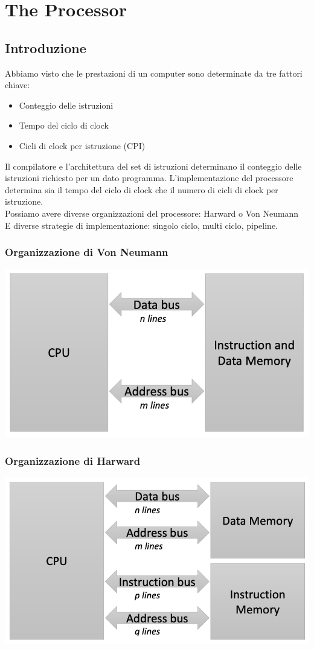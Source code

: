 \documentclass[12pt,a4paper]{article}
\begin{document}
\clearpage
\section{The Processor}
\subsection{Introduzione}
Abbiamo visto che le prestazioni di un computer sono determinate da tre fattori chiave:
\begin{itemize}
\item Conteggio delle istruzioni
\item Tempo del ciclo di clock
\item Cicli di clock per istruzione (CPI)
\end{itemize}
Il compilatore e l'architettura del set di istruzioni determinano il conteggio delle istruzioni richiesto per un dato programma. L'implementazione del processore determina sia il tempo del ciclo di clock che il numero di cicli di clock per istruzione.\\
Possiamo avere diverse organizzazioni del processore: Harward o Von Neumann\\
E diverse strategie di implementazione: singolo ciclo, multi ciclo, pipeline.

\subsubsection{Organizzazione di Von Neumann}
\begin{center}
\includegraphics[width=0.5\columnwidth]{img/von_neumann.png}
\end{center}

\subsubsection{Organizzazione di Harward}
\begin{center}
\includegraphics[width=0.5\columnwidth]{img/harward.png}
\end{center}
\end{document}
